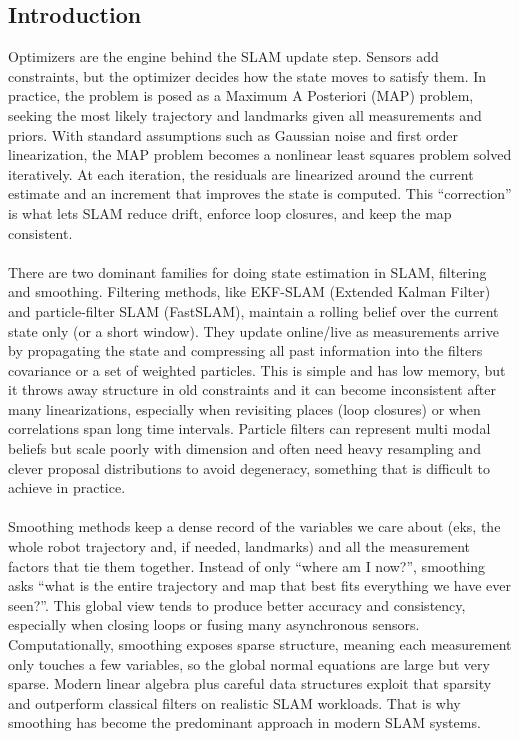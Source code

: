 \subsection{Introduction}
Optimizers are the engine behind the SLAM update step. Sensors add constraints, but the optimizer decides how the state moves to satisfy them. In practice, the problem is posed as a Maximum A Posteriori (MAP) problem, seeking the most likely trajectory and landmarks given all measurements and priors. With standard assumptions such as Gaussian noise and first order linearization, the MAP problem becomes a nonlinear least squares problem solved iteratively. At each iteration, the residuals are linearized around the current estimate and an increment that improves the state is computed. This ``correction'' is what lets SLAM reduce drift, enforce loop closures, and keep the map consistent. \cite{SLAM_part_present_future}
\\ \\
There are two dominant families for doing state estimation in SLAM, filtering and smoothing. Filtering methods, like EKF-SLAM (Extended Kalman Filter) and particle-filter SLAM (FastSLAM), maintain a rolling belief over the current state only (or a short window). They update online/live as measurements arrive by propagating the state and compressing all past information into the filters covariance or a set of weighted particles. This is simple and has low memory, but it throws away structure in old constraints and it can become inconsistent after many linearizations, especially when revisiting places (loop closures) or when correlations span long time intervals. Particle filters can represent multi modal beliefs but scale poorly with dimension and often need heavy resampling and clever proposal distributions to avoid degeneracy, something that is difficult to achieve in practice. \cite{SLAM_tutorial_part_1}\cite{SLAM_tutorial_part_2}
\\ \\
Smoothing methods keep a dense record of the variables we care about (eks, the whole robot trajectory and, if needed, landmarks) and all the measurement factors that tie them together. Instead of only ``where am I now?'', smoothing asks ``what is the entire trajectory and map that best fits everything we have ever seen?''. This global view tends to produce better accuracy and consistency, especially when closing loops or fusing many asynchronous sensors. Computationally, smoothing exposes sparse structure, meaning each measurement only touches a few variables, so the global normal equations are large but very sparse. Modern linear algebra plus careful data structures exploit that sparsity and outperform classical filters on realistic SLAM workloads. That is why smoothing has become the predominant approach in modern SLAM systems.
